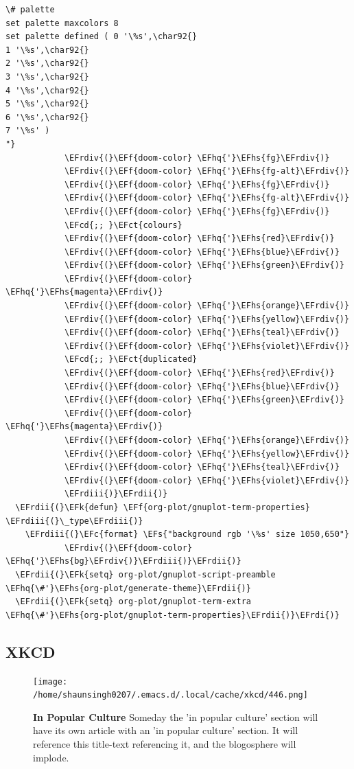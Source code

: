 \documentclass{scrartcl}
\newcommand{\EFk}[1]{\textcolor{EFk}{#1}} %
\newcommand{\EFs}[1]{\textcolor{EFs}{#1}} %
\newcommand{\EFct}[1]{\textcolor{EFct}{#1}} %
\newcommand{\EFc}[1]{\textcolor{EFc}{#1}} %
\newcommand{\EFf}[1]{\textcolor{EFf}{#1}} %
\newcommand{\EFcd}[1]{\textcolor{EFcd}{#1}} %
\newcommand{\EFhq}[1]{\textcolor{EFhq}{#1}} %
\newcommand{\EFhs}[1]{\textcolor{EFhs}{#1}} %
\newcommand{\EFrdi}[1]{\textcolor{EFrdi}{#1}} %
\newcommand{\EFrdii}[1]{\textcolor{EFrdii}{#1}} %
\newcommand{\EFrdiii}[1]{\textcolor{EFrdiii}{#1}} %
\newcommand{\EFrdiv}[1]{\textcolor{EFrdiv}{#1}} %
\begin{document}
\begin{Code}
\begin{Verbatim}[]
\# palette
set palette maxcolors 8
set palette defined ( 0 '\%s',\char92{}
1 '\%s',\char92{}
2 '\%s',\char92{}
3 '\%s',\char92{}
4 '\%s',\char92{}
5 '\%s',\char92{}
6 '\%s',\char92{}
7 '\%s' )
"}
            \EFrdiv{(}\EFf{doom-color} \EFhq{'}\EFhs{fg}\EFrdiv{)}
            \EFrdiv{(}\EFf{doom-color} \EFhq{'}\EFhs{fg-alt}\EFrdiv{)}
            \EFrdiv{(}\EFf{doom-color} \EFhq{'}\EFhs{fg}\EFrdiv{)}
            \EFrdiv{(}\EFf{doom-color} \EFhq{'}\EFhs{fg-alt}\EFrdiv{)}
            \EFrdiv{(}\EFf{doom-color} \EFhq{'}\EFhs{fg}\EFrdiv{)}
            \EFcd{;; }\EFct{colours}
            \EFrdiv{(}\EFf{doom-color} \EFhq{'}\EFhs{red}\EFrdiv{)}
            \EFrdiv{(}\EFf{doom-color} \EFhq{'}\EFhs{blue}\EFrdiv{)}
            \EFrdiv{(}\EFf{doom-color} \EFhq{'}\EFhs{green}\EFrdiv{)}
            \EFrdiv{(}\EFf{doom-color} \EFhq{'}\EFhs{magenta}\EFrdiv{)}
            \EFrdiv{(}\EFf{doom-color} \EFhq{'}\EFhs{orange}\EFrdiv{)}
            \EFrdiv{(}\EFf{doom-color} \EFhq{'}\EFhs{yellow}\EFrdiv{)}
            \EFrdiv{(}\EFf{doom-color} \EFhq{'}\EFhs{teal}\EFrdiv{)}
            \EFrdiv{(}\EFf{doom-color} \EFhq{'}\EFhs{violet}\EFrdiv{)}
            \EFcd{;; }\EFct{duplicated}
            \EFrdiv{(}\EFf{doom-color} \EFhq{'}\EFhs{red}\EFrdiv{)}
            \EFrdiv{(}\EFf{doom-color} \EFhq{'}\EFhs{blue}\EFrdiv{)}
            \EFrdiv{(}\EFf{doom-color} \EFhq{'}\EFhs{green}\EFrdiv{)}
            \EFrdiv{(}\EFf{doom-color} \EFhq{'}\EFhs{magenta}\EFrdiv{)}
            \EFrdiv{(}\EFf{doom-color} \EFhq{'}\EFhs{orange}\EFrdiv{)}
            \EFrdiv{(}\EFf{doom-color} \EFhq{'}\EFhs{yellow}\EFrdiv{)}
            \EFrdiv{(}\EFf{doom-color} \EFhq{'}\EFhs{teal}\EFrdiv{)}
            \EFrdiv{(}\EFf{doom-color} \EFhq{'}\EFhs{violet}\EFrdiv{)}
            \EFrdiii{)}\EFrdii{)}
  \EFrdii{(}\EFk{defun} \EFf{org-plot/gnuplot-term-properties} \EFrdiii{(}\_type\EFrdiii{)}
    \EFrdiii{(}\EFc{format} \EFs{"background rgb '\%s' size 1050,650"}
            \EFrdiv{(}\EFf{doom-color} \EFhq{'}\EFhs{bg}\EFrdiv{)}\EFrdiii{)}\EFrdii{)}
  \EFrdii{(}\EFk{setq} org-plot/gnuplot-script-preamble \EFhq{\#'}\EFhs{org-plot/generate-theme}\EFrdii{)}
  \EFrdii{(}\EFk{setq} org-plot/gnuplot-term-extra \EFhq{\#'}\EFhs{org-plot/gnuplot-term-properties}\EFrdii{)}\EFrdi{)}
\end{Verbatim}
\end{Code}

\subsection{XKCD}
\label{sec:org29ba882}
\begin{figure}[!htb]
	  \centering
	  \texttt{[image: /home/shaunsingh0207/.emacs.d/.local/cache/xkcd/446.png]}
  \caption*{\label{xkcd:446} \textbf{In Popular Culture} Someday the 'in popular culture' section will have its own article with an 'in popular culture' section.  It will reference this title-text referencing it, and the blogosphere will implode.}
	\end{figure}
\end{document}
